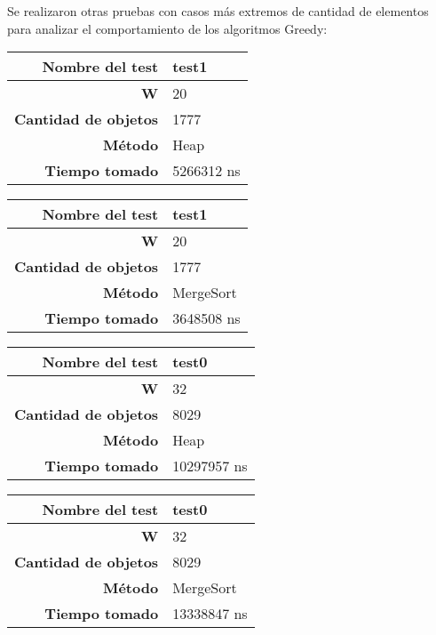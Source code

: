 \documentclass[a4paper,10pt,spanish]{article}
\begin{document}
	\vspace{4mm}
	Se realizaron otras pruebas con casos m\'as extremos de cantidad de elementos para analizar el comportamiento de los algoritmos Greedy:
	\vspace{4mm}
	\begin{center}
	\begin{tabular}{ | r | l | }
	 \hline
	 {\bf Nombre del test } & test1 \\ \hline
	 {\bf W } & 20 \\ \hline
	 {\bf Cantidad de objetos } & 1777 \\ \hline
	 {\bf M\'etodo } & Heap \\ \hline
	 {\bf Tiempo tomado } & 5266312 ns \\ \hline
	\end{tabular}
	
	\vspace{4mm}
	
	\begin{tabular}{ | r | l | }
	 \hline
	 {\bf Nombre del test } & test1 \\ \hline
	 {\bf W } & 20 \\ \hline
	 {\bf Cantidad de objetos } & 1777 \\ \hline
	 {\bf M\'etodo } & MergeSort \\ \hline
	 {\bf Tiempo tomado } & 3648508 ns \\ \hline
	\end{tabular}
	
	\vspace{4mm}
	
	\begin{tabular}{ | r | l | }
	 \hline
	 {\bf Nombre del test } & test0 \\ \hline
	 {\bf W } & 32 \\ \hline
	 {\bf Cantidad de objetos } & 8029 \\ \hline
	 {\bf M\'etodo } & Heap \\ \hline
	 {\bf Tiempo tomado } & 10297957 ns \\ \hline
	\end{tabular}
	
	\vspace{4mm}
	
	\begin{tabular}{ | r | l | }
	 \hline
	 {\bf Nombre del test } & test0 \\ \hline
	 {\bf W } & 32 \\ \hline
	 {\bf Cantidad de objetos } & 8029 \\ \hline
	 {\bf M\'etodo } & MergeSort \\ \hline
	 {\bf Tiempo tomado } & 13338847 ns \\ \hline
	\end{tabular}
	\end{center}
	
\end{document}
